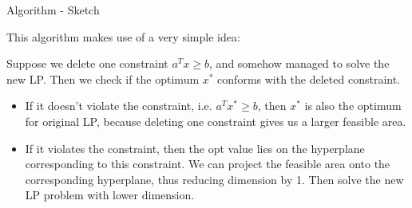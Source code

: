\documentclass{beamer}
\begin{document}
\begin{frame}{Algorithm - Sketch}

	This algorithm makes use of a very simple idea:

	\vspace{\baselineskip}

	Suppose we delete one constraint $a^T x \ge b$, and somehow managed to solve the new LP.
	Then we check if the optimum $x^*$ conforms with the deleted constraint.

	\vspace{\baselineskip}

	\begin{itemize}
		\item If it doesn't violate the constraint, i.e. $a^T x^* \ge b$, then $x^*$ is also
		      the optimum for original LP, because deleting one constraint
		      gives us a larger feasible area.
		\item If it violates the constraint, then the opt value lies on the hyperplane
		      corresponding to this constraint.  We can project the feasible area
		      onto the corresponding hyperplane, thus reducing dimension by 1. Then
		      solve the new LP problem with lower dimension.
	\end{itemize}
\end{frame}

%
%
%
\end{document}
